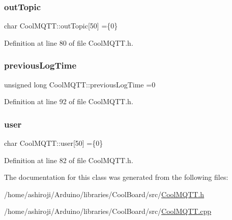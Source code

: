 \subsubsection{\texorpdfstring{out\+Topic}{outTopic}}
{\footnotesize\ttfamily char Cool\+M\+Q\+T\+T\+::out\+Topic\mbox{[}50\mbox{]} =\{\textquotesingle{}0\textquotesingle{}\}\hspace{0.3cm}{\ttfamily [private]}}



Definition at line 80 of file Cool\+M\+Q\+T\+T.\+h.

\mbox{\label{class_cool_m_q_t_t_a3db37ef9ed3b05b2a8d44edba0e7d3cc}} 
\subsubsection{\texorpdfstring{previous\+Log\+Time}{previousLogTime}}
{\footnotesize\ttfamily unsigned long Cool\+M\+Q\+T\+T\+::previous\+Log\+Time =0\hspace{0.3cm}{\ttfamily [private]}}



Definition at line 92 of file Cool\+M\+Q\+T\+T.\+h.

\mbox{\label{class_cool_m_q_t_t_a8cd47e45d457f908d4b4390b35aaee83}} 
\subsubsection{\texorpdfstring{user}{user}}
{\footnotesize\ttfamily char Cool\+M\+Q\+T\+T\+::user\mbox{[}50\mbox{]} =\{\textquotesingle{}0\textquotesingle{}\}\hspace{0.3cm}{\ttfamily [private]}}



Definition at line 82 of file Cool\+M\+Q\+T\+T.\+h.



The documentation for this class was generated from the following files\+:\begin{DoxyCompactItemize}
\item 
/home/ashiroji/\+Arduino/libraries/\+Cool\+Board/src/\hyperlink{_cool_m_q_t_t_8h}{Cool\+M\+Q\+T\+T.\+h}\item 
/home/ashiroji/\+Arduino/libraries/\+Cool\+Board/src/\hyperlink{_cool_m_q_t_t_8cpp}{Cool\+M\+Q\+T\+T.\+cpp}\end{DoxyCompactItemize}
